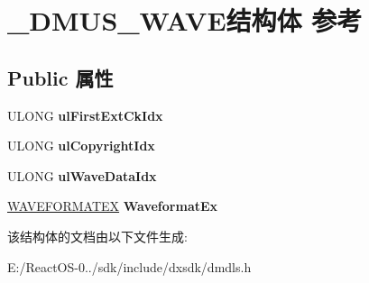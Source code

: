 \hypertarget{struct___d_m_u_s___w_a_v_e}{}\section{\+\_\+\+D\+M\+U\+S\+\_\+\+W\+A\+V\+E结构体 参考}
\label{struct___d_m_u_s___w_a_v_e}
\subsection*{Public 属性}
\begin{DoxyCompactItemize}
\item 
\mbox{\label{struct___d_m_u_s___w_a_v_e_a89e4c254426af5e60ae6f14cb2611251}} 
U\+L\+O\+NG {\bfseries ul\+First\+Ext\+Ck\+Idx}
\item 
\mbox{\label{struct___d_m_u_s___w_a_v_e_a05663f3e73dd2947fa376fa97f50bf6c}} 
U\+L\+O\+NG {\bfseries ul\+Copyright\+Idx}
\item 
\mbox{\label{struct___d_m_u_s___w_a_v_e_abee5bbc6bfb8c2281d92afba5e9c51ad}} 
U\+L\+O\+NG {\bfseries ul\+Wave\+Data\+Idx}
\item 
\mbox{\label{struct___d_m_u_s___w_a_v_e_a9120de3cd5348a9223775c9ea82db48a}} 
\hyperlink{struct_w_a_v_e_f_o_r_m_a_t_e_x}{W\+A\+V\+E\+F\+O\+R\+M\+A\+T\+EX} {\bfseries Waveformat\+Ex}
\end{DoxyCompactItemize}


该结构体的文档由以下文件生成\+:\begin{DoxyCompactItemize}
\item 
E\+:/\+React\+O\+S-\/0../sdk/include/dxsdk/dmdls.\+h\end{DoxyCompactItemize}
